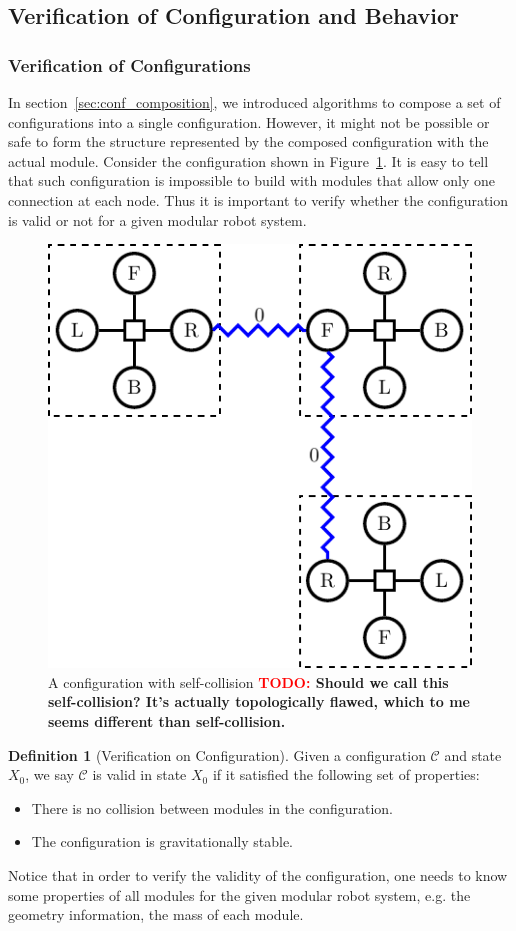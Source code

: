 \documentclass[conference]{IEEEtran}
\theoremstyle{definition}
\newtheorem{definition}{Definition}[section]
\newcommand{\TODO}[1]{ {\bf \textcolor{red}{TODO:} #1 }}
\begin{document}
\subsection{ Verification of Configuration and Behavior}

\subsubsection{Verification of Configurations}\label{sec:verify_conf} In section~\ref{sec:conf_composition}, we introduced algorithms to compose a set of configurations into a single configuration. However, it might not be possible  or safe to form the structure represented by the composed configuration with the actual module. Consider the configuration shown in Figure~\ref{fig:smores_conf_collision}. It is easy to tell that such configuration is impossible to build with modules that allow only one connection at each node. Thus it is important to verify whether the configuration is valid or not for a given modular robot system.

\begin{figure}
\begin{center}
\includegraphics[width=0.5\columnwidth]{images/tikz/smores_conf_collision.pdf}
\end{center}
\caption{A configuration with self-collision \TODO{Should we call this self-collision?
 It's actually topologically flawed, which to me seems different than self-collision.}}
\label{fig:smores_conf_collision}
\end{figure}

\begin{definition}[Verification on Configuration]
Given a configuration $\mathcal{C}$ and state \(X_0\), we say $\mathcal{C}$ is valid in
state \(X_0\) if it satisfied the following set of properties:
\begin{itemize}
\item There is no collision between modules in the configuration.
\item The configuration is gravitationally stable.
\end{itemize}
Notice that in order to verify the validity of the configuration, one needs to know some properties of all modules for the given modular robot system, e.g. the geometry information, the mass of each module.
\end{definition}
\end{document}
